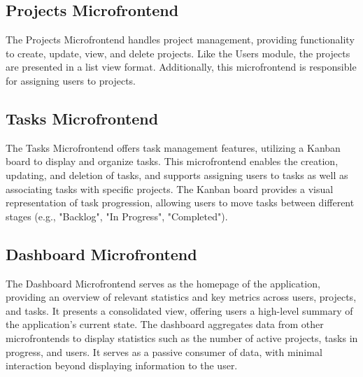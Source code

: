 \subsection{Projects Microfrontend}
The Projects Microfrontend handles project management, providing functionality to create, update, view, and delete projects. Like the Users module, the projects are presented in a list view format. Additionally, this microfrontend is responsible for assigning users to projects.

\subsection{Tasks Microfrontend}
The Tasks Microfrontend offers task management features, utilizing a Kanban board to display and organize tasks. This microfrontend enables the creation, updating, and deletion of tasks, and supports assigning users to tasks as well as associating tasks with specific projects. The Kanban board provides a visual representation of task progression, allowing users to move tasks between different stages (e.g., "Backlog", "In Progress", "Completed").

\subsection{Dashboard Microfrontend}
The Dashboard Microfrontend serves as the homepage of the application, providing an overview of relevant statistics and key metrics across users, projects, and tasks. It presents a consolidated view, offering users a high-level summary of the application’s current state. The dashboard aggregates data from other microfrontends to display statistics such as the number of active projects, tasks in progress, and users. It serves as a passive consumer of data, with minimal interaction beyond displaying information to the user.